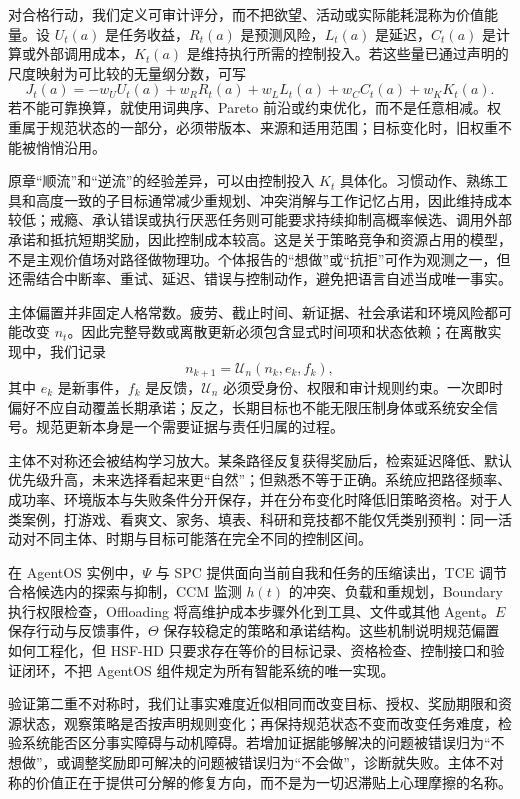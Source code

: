对合格行动，我们定义可审计评分，而不把欲望、活动或实际能耗混称为价值能量。设 $U_t(a)$ 是任务收益，$R_t(a)$ 是预测风险，$L_t(a)$ 是延迟，$C_t(a)$ 是计算或外部调用成本，$K_t(a)$ 是维持执行所需的控制投入。若这些量已通过声明的尺度映射为可比较的无量纲分数，可写
\begin{equation}
J_t(a)=-w_U U_t(a)+w_R R_t(a)+w_L L_t(a)+w_C C_t(a)+w_K K_t(a).
\end{equation}
若不能可靠换算，就使用词典序、Pareto 前沿或约束优化，而不是任意相减。权重属于规范状态的一部分，必须带版本、来源和适用范围；目标变化时，旧权重不能被悄悄沿用。

原章“顺流”和“逆流”的经验差异，可以由控制投入 $K_t$ 具体化。习惯动作、熟练工具和高度一致的子目标通常减少重规划、冲突消解与工作记忆占用，因此维持成本较低；戒瘾、承认错误或执行厌恶任务则可能要求持续抑制高概率候选、调用外部承诺和抵抗短期奖励，因此控制成本较高。这是关于策略竞争和资源占用的模型，不是主观价值场对路径做物理功。个体报告的“想做”或“抗拒”可作为观测之一，但还需结合中断率、重试、延迟、错误与控制动作，避免把语言自述当成唯一事实。

主体偏置并非固定人格常数。疲劳、截止时间、新证据、社会承诺和环境风险都可能改变 $n_t$。因此完整导数或离散更新必须包含显式时间项和状态依赖；在离散实现中，我们记录
\begin{equation}
n_{k+1}=\mathcal{U}_n(n_k,e_k,f_k),
\end{equation}
其中 $e_k$ 是新事件，$f_k$ 是反馈，$\mathcal{U}_n$ 必须受身份、权限和审计规则约束。一次即时偏好不应自动覆盖长期承诺；反之，长期目标也不能无限压制身体或系统安全信号。规范更新本身是一个需要证据与责任归属的过程。

主体不对称还会被结构学习放大。某条路径反复获得奖励后，检索延迟降低、默认优先级升高，未来选择看起来更“自然”；但熟悉不等于正确。系统应把路径频率、成功率、环境版本与失败条件分开保存，并在分布变化时降低旧策略资格。对于人类案例，打游戏、看爽文、家务、填表、科研和竞技都不能仅凭类别预判：同一活动对不同主体、时期与目标可能落在完全不同的控制区间。

在 AgentOS 实例中，$\Psi$ 与 SPC 提供面向当前自我和任务的压缩读出，TCE 调节合格候选内的探索与抑制，CCM 监测 $h(t)$ 的冲突、负载和重规划，Boundary 执行权限检查，Offloading 将高维护成本步骤外化到工具、文件或其他 Agent。$E$ 保存行动与反馈事件，$\Theta$ 保存较稳定的策略和承诺结构。这些机制说明规范偏置如何工程化，但 HSF-HD 只要求存在等价的目标记录、资格检查、控制接口和验证闭环，不把 AgentOS 组件规定为所有智能系统的唯一实现。

验证第二重不对称时，我们让事实难度近似相同而改变目标、授权、奖励期限和资源状态，观察策略是否按声明规则变化；再保持规范状态不变而改变任务难度，检验系统能否区分事实障碍与动机障碍。若增加证据能够解决的问题被错误归为“不想做”，或调整奖励即可解决的问题被错误归为“不会做”，诊断就失败。主体不对称的价值正在于提供可分解的修复方向，而不是为一切迟滞贴上心理摩擦的名称。

